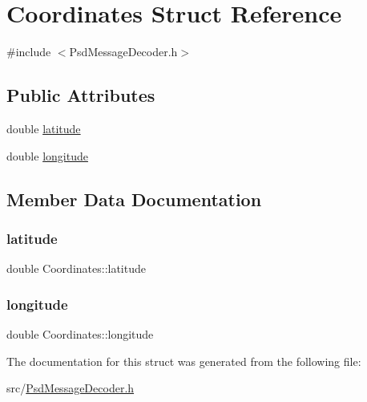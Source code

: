 \hypertarget{struct_coordinates}{}\section{Coordinates Struct Reference}
\label{struct_coordinates}


{\ttfamily \#include $<$Psd\+Message\+Decoder.\+h$>$}

\subsection*{Public Attributes}
\begin{DoxyCompactItemize}
\item 
double \hyperlink{struct_coordinates_a20ea6542be083155699517939b03f259}{latitude}
\item 
double \hyperlink{struct_coordinates_a474951b7ec4e5f12e788abbf852cd88b}{longitude}
\end{DoxyCompactItemize}


\subsection{Member Data Documentation}
\mbox{\label{struct_coordinates_a20ea6542be083155699517939b03f259}} 
\subsubsection{\texorpdfstring{latitude}{latitude}}
{\footnotesize\ttfamily double Coordinates\+::latitude}

\mbox{\label{struct_coordinates_a474951b7ec4e5f12e788abbf852cd88b}} 
\subsubsection{\texorpdfstring{longitude}{longitude}}
{\footnotesize\ttfamily double Coordinates\+::longitude}



The documentation for this struct was generated from the following file\+:\begin{DoxyCompactItemize}
\item 
src/\hyperlink{_psd_message_decoder_8h}{Psd\+Message\+Decoder.\+h}\end{DoxyCompactItemize}
